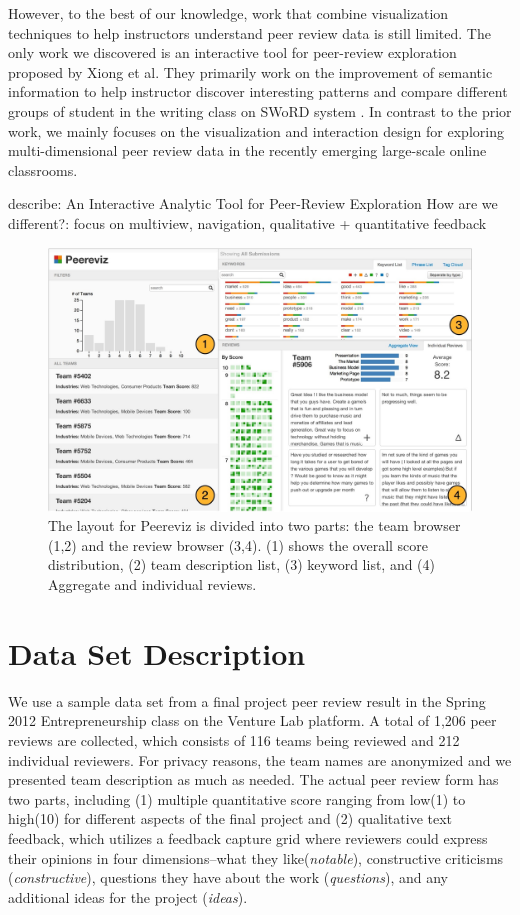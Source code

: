\documentclass{sigchi}
\begin{document}
However, to the best of our knowledge, work that combine visualization techniques
to help instructors understand peer review data is still limited.
The only work we discovered is  an interactive tool for peer-review exploration
proposed by Xiong et al. \cite{xiong}
They primarily work on the improvement of semantic information
to help instructor discover interesting patterns and
compare different groups of student in the writing class on SWoRD system \cite{Cho2007}.
In contrast to the prior work, we mainly focuses on the visualization
and interaction design for exploring multi-dimensional peer review data
in the recently emerging large-scale online classrooms.

describe: An Interactive Analytic Tool for Peer-Review Exploration How are we
different?: focus on multiview, navigation, qualitative + quantitative feedback


\begin{figure}[!t]
\centering
\includegraphics[width=2.0\columnwidth]{images/overview-annotated}
\caption{The layout for Peereviz is divided into two parts:
the team browser (1,2) and the review browser (3,4).
(1) shows the overall score distribution,
(2) team description list,
(3) keyword list, and
(4) Aggregate and individual reviews.}
\label{fig:overview-annotated}
\end{figure}

\section{Data Set Description}
We use a sample data set from a final project peer review result in the Spring
2012 Entrepreneurship class on the Venture Lab platform. A total of 1,206 peer
reviews are collected, which consists of 116 teams being reviewed and 212
individual reviewers. For privacy reasons, the team names are anonymized and we
presented team description as much as needed. The actual peer review form has
two parts, including (1) multiple quantitative score ranging from low(1) to
high(10) for different aspects of the final project and (2) qualitative text
feedback, which utilizes a feedback capture grid \cite{dbootcamp} where
reviewers could express their opinions in four dimensions–what they
like(\emph{notable}), constructive criticisms (\emph{constructive}), questions
they have about the work (\emph{questions}), and any additional ideas for the
project (\emph{ideas}).
\end{document}
